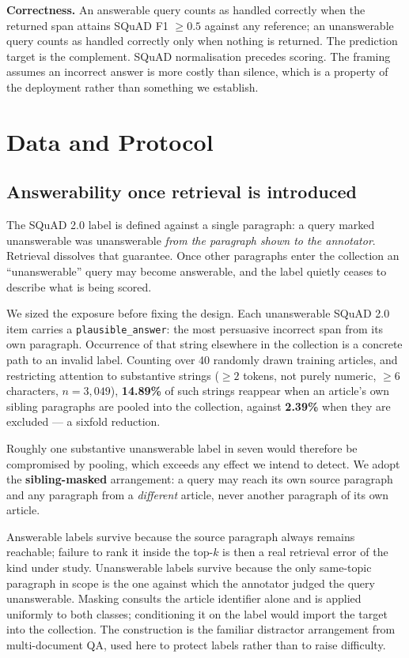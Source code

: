 \documentclass[conference]{IEEEtran}
\begin{document}
\textbf{Correctness.} An answerable query counts as handled correctly when the
returned span attains SQuAD F1 $\geq 0.5$ against any reference; an unanswerable
query counts as handled correctly only when nothing is returned. The prediction
target is the complement. SQuAD normalisation precedes scoring. The framing assumes
an incorrect answer is more costly than silence, which is a property of the
deployment rather than something we establish.

\section{Data and Protocol}
\subsection{Answerability once retrieval is introduced}
The SQuAD 2.0 label is defined against a single paragraph: a query marked
unanswerable was unanswerable \emph{from the paragraph shown to the annotator}.
Retrieval dissolves that guarantee. Once other paragraphs enter the collection an
``unanswerable'' query may become answerable, and the label quietly ceases to
describe what is being scored.

We sized the exposure before fixing the design. Each unanswerable SQuAD 2.0 item
carries a \texttt{plausible\_answer}: the most persuasive incorrect span from its
own paragraph. Occurrence of that string elsewhere in the collection is a concrete
path to an invalid label. Counting over 40 randomly drawn training articles, and
restricting attention to substantive strings ($\geq 2$ tokens, not purely numeric,
$\geq 6$ characters, $n = 3{,}049$), \textbf{14.89\%} of such strings reappear when
an article's own sibling paragraphs are pooled into the collection, against
\textbf{2.39\%} when they are excluded --- a sixfold reduction.

Roughly one substantive unanswerable label in seven would therefore be
compromised by pooling, which exceeds any effect we intend to detect. We adopt the
\textbf{sibling-masked} arrangement: a query may reach its own source paragraph and
any paragraph from a \emph{different} article, never another paragraph of its own
article.

Answerable labels survive because the source paragraph always remains reachable;
failure to rank it inside the top-$k$ is then a real retrieval error of the kind
under study. Unanswerable labels survive because the only same-topic paragraph in
scope is the one against which the annotator judged the query unanswerable. Masking
consults the article identifier alone and is applied uniformly to both classes;
conditioning it on the label would import the target into the collection. The
construction is the familiar distractor arrangement from multi-document QA, used
here to protect labels rather than to raise difficulty.
\end{document}
